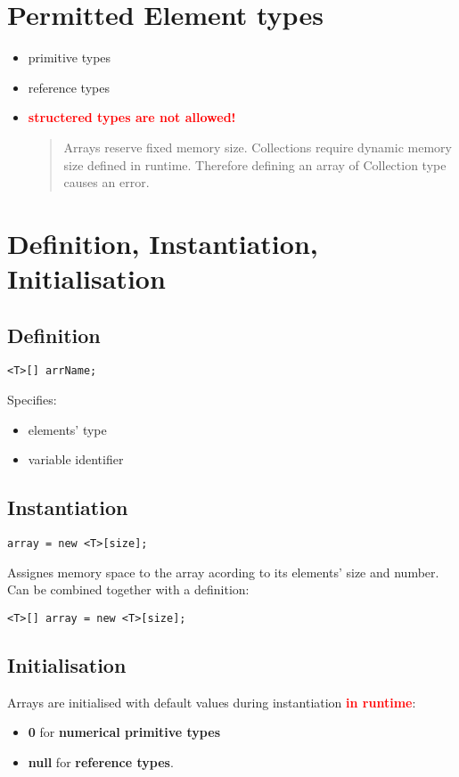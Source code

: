 \documentclass{report}
\begin{document}
\section{Permitted Element types}
\begin{itemize}
	\item primitive types
	\item reference types
	\item \textbf{\textcolor{red}{structered types are not allowed!}}
	\begin{quote}
		Arrays reserve fixed memory size. Collections require dynamic memory size defined in runtime.
		Therefore defining an array of Collection type causes an error. 
	\end{quote}
\end{itemize}


\section{Definition, Instantiation, Initialisation}
\subsection{Definition}
\begin{verbatim}
<T>[] arrName;
\end{verbatim}
Specifies:
\begin{itemize}
	\item elements' type
	\item variable identifier
\end{itemize}

\subsection{Instantiation}
\begin{verbatim}
array = new <T>[size];
\end{verbatim}
Assignes memory space to the array acording to its elements' size and number.
Can be combined together with a definition:
\begin{verbatim}
<T>[] array = new <T>[size];
\end{verbatim} 

\subsection{Initialisation}
Arrays are initialised with default values during instantiation \textbf{\textcolor{red}{in runtime}}:
\begin{itemize}
	\item \textbf{0} for \textbf{numerical primitive types}
	\item \textbf{null} for \textbf{reference types}.
\end{itemize}
\end{document}
